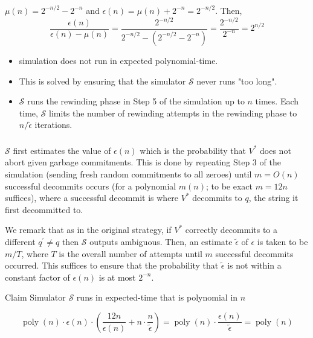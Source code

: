 \documentclass{beamer}
\begin{document}
    \begin{frame}
        \frametitle{}
    
        $\mu(n)=2^{-n / 2}-2^{-n}$ and $\epsilon(n)=\mu(n)+2^{-n}=2^{-n / 2}$. 
        Then,
        $$
        \frac{\epsilon(n)}{\epsilon(n)-\mu(n)}=\frac{2^{-n / 2}}{2^{-n / 2}-\left(2^{-n / 2}-2^{-n}\right)}=\frac{2^{-n / 2}}{2^{-n}}=2^{n / 2}
        $$

      
        \begin{itemize}
            \item simulation does not run in expected polynomial-time.
            \item This is solved by ensuring that the simulator $\mathcal{S}$ never runs "too long". 
            \item $\mathcal{S}$ runs the rewinding phase in Step 5 of the simulation up to $n$ times. Each time, $\mathcal{S}$ limits the number of rewinding attempts in the rewinding phase to $n / \tilde{\epsilon}$ iterations. 
        \end{itemize}
        
    
    \end{frame}

    \begin{frame}
        \frametitle{}
    
        $\mathcal{S}$ first estimates the value of $\epsilon(n)$ which is the probability that $V^{*}$ does not abort given garbage commitments. This is done by repeating Step 3 of the simulation (sending fresh random commitments to all zeroes) until $m=O(n)$ successful decommits occurs (for a polynomial $m(n)$; to be exact $m=12 n$ suffices), where a successful decommit is where $V^{*}$ decommits to $q$, the string it first decommitted to. 

        We remark that as in the original strategy, if $V^{*}$ correctly decommits to a different $q^{\prime} \neq q$ then $\mathcal{S}$ outputs ambiguous. Then, an estimate $\tilde{\epsilon}$ of $\epsilon$ is taken to be $m / T$, where $T$ is the overall number of attempts until $m$ successful decommits occurred. This suffices to ensure that the probability that $\tilde{\epsilon}$ is not within a constant factor of $\epsilon(n)$ is at most $2^{-n}$.

        \begin{block}{Claim}
            Simulator $\mathcal{S}$ runs in expected-time that is polynomial in $n$
            
        \end{block}

        $$
        \operatorname{poly}(n) \cdot \epsilon(n) \cdot\left(\frac{12 n}{\epsilon(n)}+n \cdot \frac{n}{\tilde{\epsilon}}\right)=\operatorname{poly}(n) \cdot \frac{\epsilon(n)}{\tilde{\epsilon}}=\operatorname{poly}(n)
        $$
    
    \end{frame}
\end{document}
